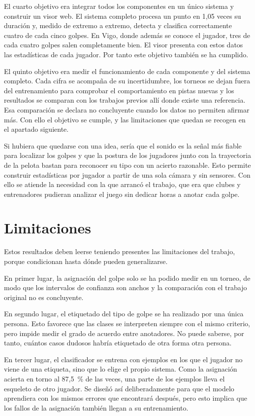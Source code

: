 El cuarto objetivo era integrar todos los componentes en un único sistema y construir un visor web.
El sistema completo procesa un punto en 1,05 veces su duración y, medido de extremo a extremo, detecta y clasifica correctamente cuatro de cada cinco golpes.
En Vigo, donde además se conoce el jugador, tres de cada cuatro golpes salen completamente bien.
El visor presenta con estos datos las estadísticas de cada jugador.
Por tanto este objetivo también se ha cumplido.

El quinto objetivo era medir el funcionamiento de cada componente y del sistema completo.
Cada cifra se acompaña de su incertidumbre, los torneos se dejan fuera del entrenamiento para comprobar el comportamiento en pistas nuevas y los resultados se comparan con los trabajos previos allí donde existe una referencia.
Esa comparación se declara no concluyente cuando los datos no permiten afirmar más.
Con ello el objetivo se cumple, y las limitaciones que quedan se recogen en el apartado siguiente.

Si hubiera que quedarse con una idea, sería que el sonido es la señal más fiable para localizar los golpes y que la postura de los jugadores junto con la trayectoria de la pelota bastan para reconocer su tipo con un acierto razonable.
Esto permite construir estadísticas por jugador a partir de una sola cámara y sin sensores.
Con ello se atiende la necesidad con la que arrancó el trabajo, que era que clubes y entrenadores pudieran analizar el juego sin dedicar horas a anotar cada golpe.

\section{Limitaciones}
\label{sec:limitaciones}

Estos resultados deben leerse teniendo presentes las limitaciones del trabajo, porque condicionan hasta dónde pueden generalizarse.

En primer lugar, la asignación del golpe solo se ha podido medir en un torneo, de modo que los intervalos de confianza son anchos y la comparación con el trabajo original no es concluyente.

En segundo lugar, el etiquetado del tipo de golpe se ha realizado por una única persona.
Esto favorece que las clases se interpreten siempre con el mismo criterio, pero impide medir el grado de acuerdo entre anotadores.
No puede saberse, por tanto, cuántos casos dudosos habría etiquetado de otra forma otra persona.

En tercer lugar, el clasificador se entrena con ejemplos en los que el jugador no viene de una etiqueta, sino que lo elige el propio sistema.
Como la asignación acierta en torno al 87,5~\% de las veces, una parte de los ejemplos lleva el esqueleto de otro jugador.
Se diseñó así deliberadamente para que el modelo aprendiera con los mismos errores que encontrará después, pero esto implica que los fallos de la asignación también llegan a su entrenamiento.

